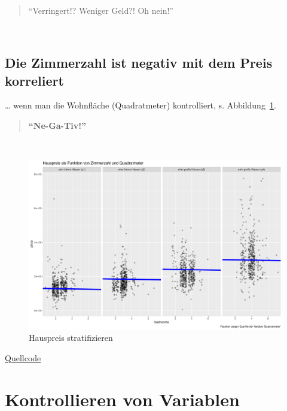 \documentclass[
  a4paper,
  DIV=11]{scrreprt}
\theoremstyle{definition}
\theoremstyle{remark}
\begin{document}
👩

\begin{quote}
``Verringert!? Weniger Geld?! Oh nein!''
\end{quote}

🧑

\hypertarget{die-zimmerzahl-ist-negativ-mit-dem-preis-korreliert}{%
\subsection{Die Zimmerzahl ist negativ mit dem Preis
korreliert}\label{die-zimmerzahl-ist-negativ-mit-dem-preis-korreliert}}

\ldots{} wenn man die Wohnfläche (Quadratmeter) kontrolliert, s.
Abbildung~\ref{fig-m2-negativ}.

\begin{quote}
\textbf{``Ne-Ga-Tiv!''}
\end{quote}

👩

\begin{figure}

{\centering \includegraphics{./img/hauspreis1.png}

}

\caption{\label{fig-m2-negativ}Hauspreis stratifizieren}

\end{figure}

\href{https://github.com/sebastiansauer/QM2-Folien/blob/main/Themen/children/Hauspreis-stratifizieren.Rmd}{Quellcode}

\hypertarget{kontrollieren-von-variablen}{%
\section{Kontrollieren von
Variablen}\label{kontrollieren-von-variablen}}
\end{document}
